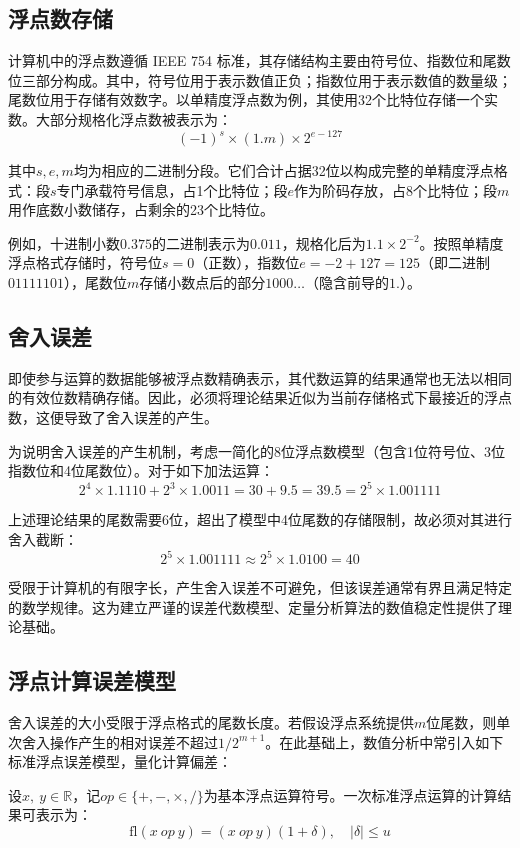 ﻿\documentclass[UTF8,a4paper,openany]{ctexbook}
\theoremstyle{qrplain}
\begin{document}
\subsection{浮点数存储}

计算机中的浮点数遵循 IEEE 754 标准，其存储结构主要由符号位、指数位和尾数位三部分构成。其中，符号位用于表示数值正负；指数位用于表示数值的数量级；尾数位用于存储有效数字。以单精度浮点数为例，其使用32个比特位存储一个实数。大部分规格化浮点数被表示为：
$$(-1)^s\times(1.m)\times2^{e-127}$$

其中$s, e, m$均为相应的二进制分段。它们合计占据32位以构成完整的单精度浮点格式：段$s$专门承载符号信息，占1个比特位；段$e$作为阶码存放，占8个比特位；段$m$用作底数小数储存，占剩余的23个比特位。

例如，十进制小数$0.375$的二进制表示为$0.011$，规格化后为$1.1\times2^{-2}$。按照单精度浮点格式存储时，符号位$s=0$（正数），指数位$e=-2+127=125$（即二进制$01111101$），尾数位$m$存储小数点后的部分$1000\ldots$（隐含前导的$1.$）。

\subsection{舍入误差}

即使参与运算的数据能够被浮点数精确表示，其代数运算的结果通常也无法以相同的有效位数精确存储。因此，必须将理论结果近似为当前存储格式下最接近的浮点数，这便导致了舍入误差的产生。

为说明舍入误差的产生机制，考虑一简化的8位浮点数模型（包含1位符号位、3位指数位和4位尾数位）。对于如下加法运算：
$$2^4\times1.1110+2^3\times1.0011=30+9.5=39.5=2^5\times1.001111$$

上述理论结果的尾数需要6位，超出了模型中4位尾数的存储限制，故必须对其进行舍入截断：
$$2^5\times1.001111\approx2^5\times1.0100=40$$

受限于计算机的有限字长，产生舍入误差不可避免，但该误差通常有界且满足特定的数学规律。这为建立严谨的误差代数模型、定量分析算法的数值稳定性提供了理论基础。

\subsection{浮点计算误差模型}

舍入误差的大小受限于浮点格式的尾数长度。若假设浮点系统提供$m$位尾数，则单次舍入操作产生的相对误差不超过$1/2^{m+1}$。在此基础上，数值分析中常引入如下标准浮点误差模型，量化计算偏差：

设$x,\ y\in\mathbb{R}$，记$op\in\{+,-,\times,/\}$为基本浮点运算符号。一次标准浮点运算的计算结果可表示为：
$$\mathrm{fl}(x\ op\ y)=(x\ op\ y)(1+\delta),\quad |\delta|\le u$$
\end{document}

